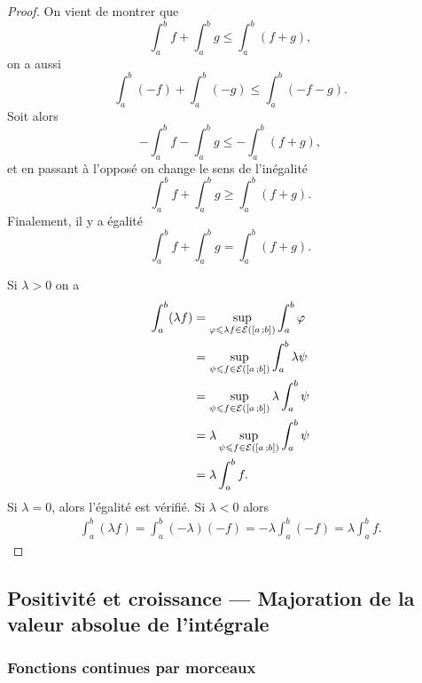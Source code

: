 \begin{proof}
  On vient de montrer que
  \begin{equation}
    \int_a^b f + \int_a^b g \leqslant \int_a^b (f+g),
  \end{equation}
  on a aussi
  \begin{equation}
    \int_a^b (-f) + \int_a^b (-g) \leqslant \int_a^b (-f-g).
  \end{equation}
  Soit alors
  \begin{equation}
    -\int_a^b f - \int_a^b g \leqslant -\int_a^b (f+g),
  \end{equation}
  et en passant à l'opposé on change le sens de l'inégalité
  \begin{equation}
    \int_a^b f + \int_a^b g \geqslant \int_a^b (f+g).
  \end{equation}
  Finalement, il y a égalité \begin{equation}
    \int_a^b f + \int_a^b g = \int_a^b (f+g).
  \end{equation}

  Si \(\lambda>0\) on a
  \begin{align*}
    \int_a^b (\lambda f) &= \sup\limits_{\varphi \leqslant \lambda f \in
    \mathcal{E}(\left[ a \, ; {} b \right])} \int_a^b \varphi \\
    &= \sup\limits_{\psi \leqslant f \in \mathcal{E}(\left[ a \, ; {} b \right])} \int_a^b
    \lambda \psi \\
    &= \sup\limits_{\psi \leqslant f \in \mathcal{E}(\left[ a \, ; {} b \right])} \lambda
    \int_a^b \psi \\
    &= \lambda \sup\limits_{\psi \leqslant f \in \mathcal{E}(\left[ a \, ; {} b \right])}
    \int_a^b \psi \\
    &=\lambda \int_a^b f.
  \end{align*}
  Si \(\lambda=0\), alors l'égalité est vérifié. Si \(\lambda<0\) alors
  \begin{align*}
    \int_a^b (\lambda f) = \int_a^b (-\lambda)(-f) = -\lambda \int_a^b(-f) =
    \lambda \int_a^b f.
  \end{align*}
\end{proof}

\subsection{Positivité et croissance --- Majoration de la valeur absolue de
l'intégrale}

\subsubsection{Fonctions continues par morceaux}

